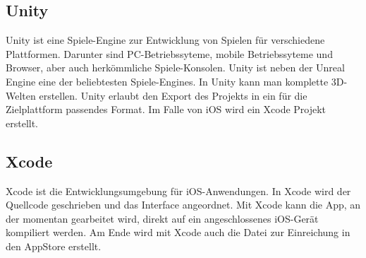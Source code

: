 \subsection{Unity}
Unity ist eine Spiele-Engine zur Entwicklung von Spielen für verschiedene Plattformen. Darunter sind PC-Betriebssyteme, mobile Betriebssyteme und Browser, aber auch herkömmliche Spiele-Konsolen. Unity ist neben der Unreal Engine eine der beliebtesten Spiele-Engines. In Unity kann man komplette 3D-Welten erstellen. Unity erlaubt den Export des Projekts in ein für die Zielplattform passendes Format. Im Falle von iOS wird ein Xcode Projekt erstellt. \cite{unity}

\subsection{Xcode}
Xcode ist die Entwicklungsumgebung für iOS-Anwendungen. In Xcode wird der Quellcode geschrieben und das Interface angeordnet. Mit Xcode kann die App, an der momentan gearbeitet wird, direkt auf ein angeschlossenes iOS-Gerät kompiliert werden. Am Ende wird mit Xcode auch die Datei zur Einreichung in den AppStore erstellt.